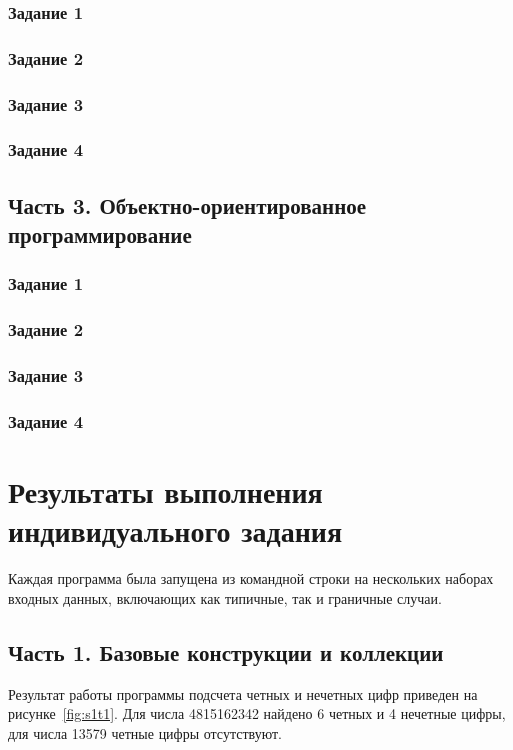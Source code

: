 \documentclass[14pt,a4paper]{extarticle}
\begin{document}
\subsubsection{Задание 1}

\subsubsection{Задание 2}

\subsubsection{Задание 3}

\subsubsection{Задание 4}


\subsection{Часть 3. Объектно-ориентированное программирование}
\subsubsection{Задание 1}

\subsubsection{Задание 2}

\subsubsection{Задание 3}

\subsubsection{Задание 4}


\section{Результаты выполнения индивидуального задания}
Каждая программа была запущена из командной строки на нескольких наборах входных данных, включающих как типичные, так и граничные случаи.

\subsection{Часть 1. Базовые конструкции и коллекции}
Результат работы программы подсчета четных и нечетных цифр приведен на рисунке~\ref{fig:s1t1}. Для числа 4815162342 найдено 6 четных и 4 нечетные цифры, для числа 13579 четные цифры отсутствуют.
\end{document}
